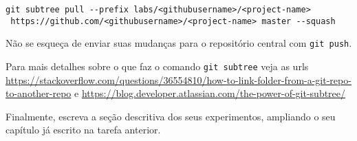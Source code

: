 {\footnotesize
\begin{verbatim}
git subtree pull --prefix labs/<githubusername>/<project-name> 
 https://github.com/<githubusername>/<project-name> master --squash
\end{verbatim}
}

Não se esqueça de enviar suas mudanças para o repositório central com \verb|git push|.

Para mais detalhes sobre o que faz o comando \verb|git subtree| veja as urls \url{https://stackoverflow.com/questions/36554810/how-to-link-folder-from-a-git-repo-to-another-repo} e \url{https://blog.developer.atlassian.com/the-power-of-git-subtree/}

Finalmente, escreva a seção descritiva dos seus experimentos, ampliando o seu capítulo já escrito na tarefa anterior.





    

